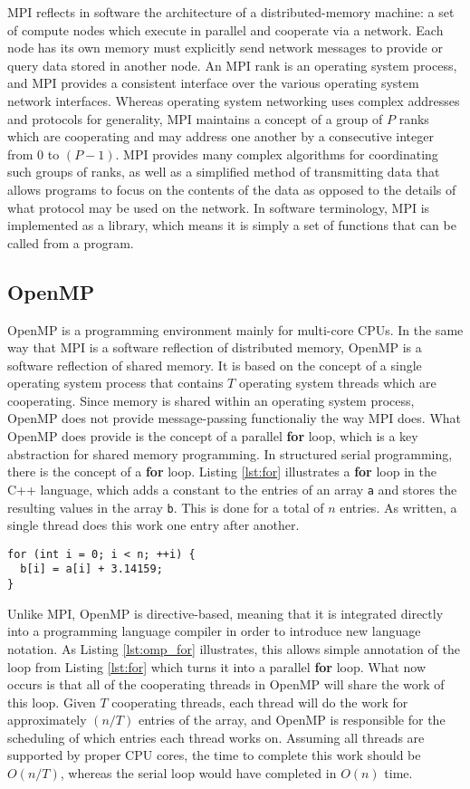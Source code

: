 MPI reflects in software the architecture of a distributed-memory
machine: a set of compute nodes which execute in parallel
and cooperate via a network.
Each node has its own memory must explicitly send network messages to provide
or query data stored in another node.
An MPI rank is an operating system process, and MPI provides a
consistent interface over the various operating system network interfaces.
Whereas operating system networking uses complex addresses and protocols
for generality, MPI maintains a concept of a group of $P$ ranks which are
cooperating and may address one another by a consecutive integer from
$0$ to $(P-1)$.
MPI provides many complex algorithms for coordinating such groups of ranks,
as well as a simplified method of transmitting data that allows programs
to focus on the contents of the data as opposed to the details of what
protocol may be used on the network.
In software terminology, MPI is implemented as a library, which means it
is simply a set of functions that can be called from a program.

\subsection{OpenMP}
\label{sec:openmp}

OpenMP is a programming environment mainly for multi-core CPUs.
In the same way that MPI is a software reflection of distributed memory,
OpenMP is a software reflection of shared memory.
It is based on the concept of a single operating system process
that contains $T$ operating system threads which are cooperating.
Since memory is shared within an operating system process, OpenMP
does not provide message-passing functionaliy the way MPI does.
What OpenMP does provide is the concept of a parallel {\bf for} loop,
which is a key abstraction for shared memory programming.
In structured serial programming, there is the concept of a {\bf for} loop.
Listing \ref{lst:for} illustrates a {\bf for} loop in the C++ language,
which adds a constant to the entries of an array {\tt a} and stores
the resulting values in the array {\tt b}.
This is done for a total of $n$ entries.
As written, a single thread does this work one entry after another.

\begin{lstlisting}[float,style=dan-style,caption=Serial {\bf for} loop,label=lst:for]
for (int i = 0; i < n; ++i) {
  b[i] = a[i] + 3.14159;
}
\end{lstlisting}

Unlike MPI, OpenMP is directive-based, meaning that it is integrated
directly into a programming language compiler in order to introduce
new language notation.
As Listing \ref{lst:omp_for} illustrates, this allows simple annotation
of the loop from Listing \ref{lst:for} which turns it into a parallel {\bf for} loop.
What now occurs is that all of the cooperating threads in OpenMP will share
the work of this loop.
Given $T$ cooperating threads, each thread will do the work for approximately
$(n/T)$ entries of the array, and OpenMP is responsible for the scheduling of
which entries each thread works on.
Assuming all threads are supported by proper CPU cores, the time to complete this
work should be $O(n/T)$, whereas the serial loop would have completed in $O(n)$ time.

